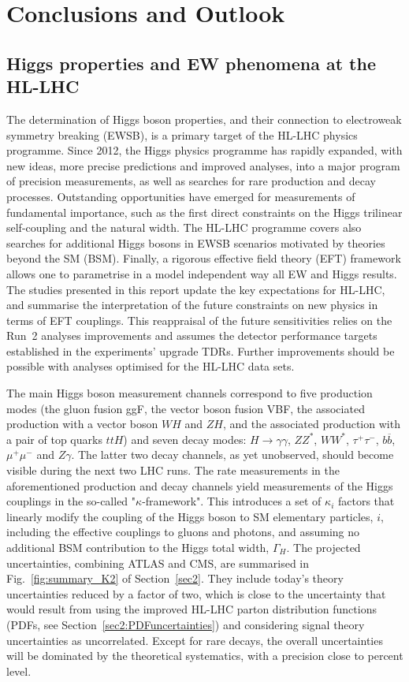 \documentclass[../report.tex]{subfiles}
\begin{document}
\section{Conclusions and Outlook}
\subsection{Higgs properties and EW phenomena at the HL-LHC}
The determination of Higgs boson properties, and their connection to electroweak symmetry breaking (EWSB), is a primary target of the HL-LHC physics programme. Since 2012, the Higgs physics programme has rapidly expanded, with new ideas, more precise predictions and improved analyses, into a major program of precision measurements, as well as searches for rare production and decay processes. Outstanding opportunities have emerged for measurements of fundamental importance, such as the first direct constraints on the Higgs trilinear self-coupling and the natural width. The HL-LHC programme covers also searches for additional Higgs bosons in EWSB scenarios motivated by theories beyond the SM (BSM). Finally, a rigorous effective field theory (EFT) framework allows one to parametrise in a model independent way all EW and Higgs results. 
The studies presented in this report update the key expectations for HL-LHC,  and summarise the interpretation of the future constraints on new physics in terms of EFT couplings. This reappraisal of the future sensitivities relies on the Run~2 analyses improvements and assumes the detector performance targets established in the experiments' upgrade TDRs.
Further improvements should be possible with analyses optimised for the HL-LHC data sets.

The main Higgs boson measurement channels correspond to five production modes (the gluon fusion ggF, the vector boson fusion VBF, the associated production with a vector boson $WH$ and $ZH$, and the associated production with a pair of top quarks $ttH$) and seven decay modes: $H \to \gamma\gamma$, $ZZ^*$, $WW^*$, $\tau^+\tau^-$, $b\overline{b}$, $\mu^+\mu^-$ and $Z\gamma$. The latter two decay channels, as yet unobserved, should become visible during the next two LHC runs. 
The rate measurements in the aforementioned production and decay channels yield measurements of the Higgs couplings in the so-called "$\kappa$-framework". This introduces a set of $\kappa_i$ factors that linearly modify the coupling of the Higgs boson to SM elementary particles, $i$, including the effective couplings to gluons and photons, and assuming no additional BSM contribution to the Higgs total width, $\Gamma_H$. The projected uncertainties, combining ATLAS and CMS, are summarised in Fig.~\ref{fig:summary_K2} of Section~\ref{sec2}. They include today's theory uncertainties reduced by a factor of two, which is close to the uncertainty that would result from using the improved HL-LHC parton distribution functions (PDFs, see Section~\ref{sec2:PDFuncertainties}) and considering signal theory uncertainties as uncorrelated. Except for rare decays, the overall uncertainties will be dominated by the theoretical systematics, with a precision close to percent level.
\end{document}
